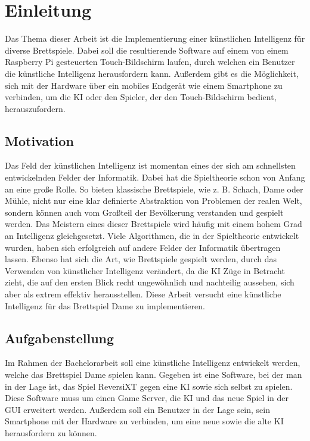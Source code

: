 \documentclass[12pt,a4paper,bibliography=totocnumbered,listof=totocnumbered]{article}
\begin{document}
{}
\renewcommand{\thesection}{\arabic{section}}
\renewcommand{\theHsection}{\arabic{section}}
\setcounter{section}{0}
\setcounter{page}{1}

\section{Einleitung}
Das Thema dieser Arbeit ist die Implementierung einer künstlichen Intelligenz für diverse
Brettspiele. Dabei soll die resultierende Software auf einem von einem Raspberry Pi gesteuerten 
Touch-Bildschirm laufen, durch welchen ein Benutzer die künstliche Intelligenz herausfordern kann.
Außerdem gibt es die Möglichkeit, sich mit der Hardware über ein mobiles Endgerät wie einem 
Smartphone zu verbinden, um die \ac{KI} oder den Spieler, der den Touch-Bildschirm bedient,
herauszufordern.

\subsection{Motivation}
Das Feld der künstlichen Intelligenz ist momentan eines der sich am schnellsten 
entwickelnden Felder der Informatik. Dabei hat die Spieltheorie schon von Anfang an eine 
große Rolle. So bieten klassische Brettspiele, wie z. B. Schach, Dame oder Mühle, nicht nur 
eine klar definierte Abstraktion von Problemen der realen Welt, sondern können auch vom 
Großteil der Bevölkerung verstanden und gespielt werden. Das Meistern eines dieser 
Brettspiele wird häufig mit einem hohem Grad an Intelligenz gleichgesetzt. Viele Algorithmen,
die in der Spieltheorie entwickelt wurden, haben sich erfolgreich auf andere Felder
der Informatik übertragen lassen. Ebenso hat sich die Art, wie Brettspiele gespielt werden, 
durch das Verwenden von künstlicher Intelligenz verändert, da die \ac{KI} Züge in Betracht 
zieht, die auf den ersten Blick recht ungewöhnlich und nachteilig aussehen, sich aber als 
extrem effektiv herausstellen. Diese Arbeit versucht eine künstliche Intelligenz für das
Brettspiel Dame zu implementieren.

\subsection{Aufgabenstellung}
\label{chap:Aufgabenstellung}
Im Rahmen der Bachelorarbeit soll eine künstliche Intelligenz entwickelt werden, welche 
das Brettspiel Dame spielen kann. Gegeben ist eine Software, bei der man in der Lage ist,
das Spiel \ac{ReversiXT} gegen eine \ac{KI} sowie sich selbst zu spielen. Diese 
Software muss um einen Game Server, die \ac{KI} und das neue Spiel in der \ac{GUI} erweitert werden.
Außerdem soll ein Benutzer in der Lage sein, sein Smartphone mit der Hardware zu 
verbinden, um eine neue sowie die alte \ac{KI} herausfordern zu können.
\end{document}
